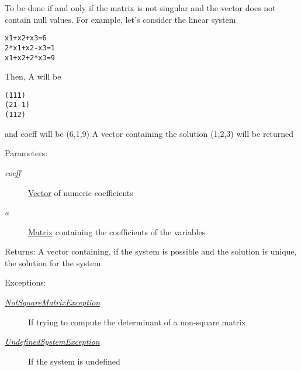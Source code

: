 To be done if and only if the matrix is not singular and the vector does not contain null values. For example, let's consider the linear system

\small\begin{alltt}		x1 + x2 + x3 = 6
 		2*x1 + x2 - x3 = 1
 		x1 + x2 + 2*x3 = 9\end{alltt}
\normalsize 


Then, A will be

\small\begin{alltt} 		(1  1  1)
 		(2  1 -1)
 		(1  1  2)\end{alltt}
\normalsize 


and coeff will be (6,1,9) A vector containing the solution (1,2,3) will be returned

\begin{Desc}
\item[Parameters:]
\begin{description}
\item[{\em coeff}]\hyperlink{classgrassmann_1_1Vector}{Vector} of numeric coefficients \item[{\em a}]\hyperlink{classgrassmann_1_1Matrix}{Matrix} containing the coefficients of the variables \end{description}
\end{Desc}
\begin{Desc}
\item[Returns:]A vector containing, if the system is possible and the solution is unique, the solution for the system \end{Desc}
\begin{Desc}
\item[Exceptions:]
\begin{description}
\item[{\em \hyperlink{classgrassmann_1_1NotSquareMatrixException}{NotSquareMatrixException}}]If trying to compute the determinant of a non-square matrix \item[{\em \hyperlink{classgrassmann_1_1UndefinedSystemException}{UndefinedSystemException}}]If the system is undefined \end{description}
\end{Desc}

